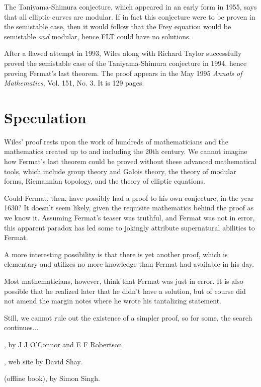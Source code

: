 \documentclass[12pt]{article}
\begin{document}
The Taniyama-Shimura conjecture, which appeared in an early form in 1955, says that all elliptic curves are modular.  If in fact this conjecture were to be proven in the semistable case, then it would follow that the Frey equation would be semistable \emph{and} modular, hence FLT could have no solutions. 

After a flawed attempt in 1993, Wiles along with Richard Taylor successfully proved the semistable case of the Taniyama-Shimura conjecture in 1994, hence proving Fermat's last theorem.  The proof appears in the May 1995 {\it Annals of Mathematics}, Vol. 151, No. 3. It is 129 pages.

\section{Speculation}

Wiles' proof rests upon the work of hundreds of mathematicians and the mathematics created up to and including the 20th century.  We cannot imagine how Fermat's last theorem could be proved without these advanced mathematical tools, which include group theory and Galois theory, the theory of modular forms, Riemannian topology, and the theory of elliptic equations.  

Could Fermat, then, have possibly had a proof to his own conjecture, in the year 1630?  It doesn't seem likely, given the requisite mathematics behind the proof as we know it.  Assuming Fermat's teaser was truthful, and Fermat was not in error, this apparent paradox has led some to jokingly attribute supernatural abilities to Fermat.

A more interesting possibility is that there is yet another proof, which is elementary and utilizes no more knowledge than Fermat had available in his day.          

Most mathematicians, however, think that Fermat was just in error.  It is also possible that he realized later that he didn't have a solution, but of course did not amend the margin notes where he wrote his tantalizing statement.  

Still, we cannot rule out the existence of a simpler proof, so for some, the search continues...

\begin{thebibliography}{3}

 ,  by J J O'Connor and E F Robertson.

 , web site by David Shay.

  (offline book), by Simon Singh.

\end{thebibliography}
\end{document}
